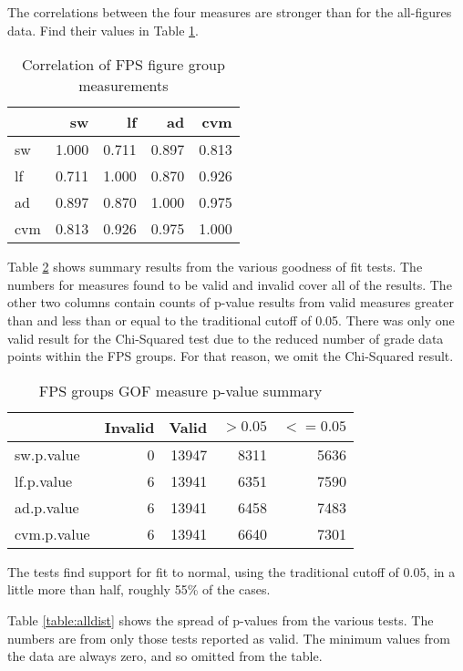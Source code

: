The correlations between the four measures are stronger than for the
all-figures data.
Find their values in Table \ref{table:fpscorr}.

\begin{table}[htbp]
  \begin{tabular}{l | r r r r}
  & sw & lf & ad & cvm \\
   \hline
  sw   & 1.000  & 0.711  & 0.897   & 0.813 \\
  lf   & 0.711  & 1.000  & 0.870   & 0.926 \\
  ad   & 0.897  & 0.870  & 1.000   & 0.975 \\
  cvm  & 0.813  & 0.926  & 0.975   & 1.000 \\
  \end{tabular}
  \caption{Correlation of FPS figure group measurements}
  \label{table:fpscorr}
\end{table}

Table \ref{table:fpssumm} shows summary results from the various goodness
of fit tests.
The numbers for measures found to be valid and invalid cover all of the
results.
The other two columns contain counts of p-value results from valid measures
greater than and less than or equal to the traditional cutoff of 0.05.
There was only one valid result for the Chi-Squared test due to the
reduced number of grade data points within the FPS groups. For that reason,
we omit the Chi-Squared result.

\begin{table}[htbp]
\centering
\begin{tabular}{l | r r r r}
& Invalid & Valid & $> 0.05$ & $<= 0.05$ \\
 \hline
sw.p.value  & 0 & 13947 & 8311 & 5636 \\
lf.p.value  & 6 & 13941 & 6351 & 7590 \\
ad.p.value  & 6 & 13941 & 6458 & 7483 \\
cvm.p.value & 6 & 13941 & 6640 & 7301 \\
\end{tabular}
\caption{FPS groups GOF measure p-value summary}
\label{table:fpssumm}
\end{table}

The tests find support for fit to normal, using the traditional cutoff of
0.05, in a little more than half, roughly 55\% of the cases.

Table \ref{table:alldist} shows the spread of p-values from the various tests.
The numbers are from only those tests reported as valid.
The minimum values from the data are always zero, and so omitted from the table.

